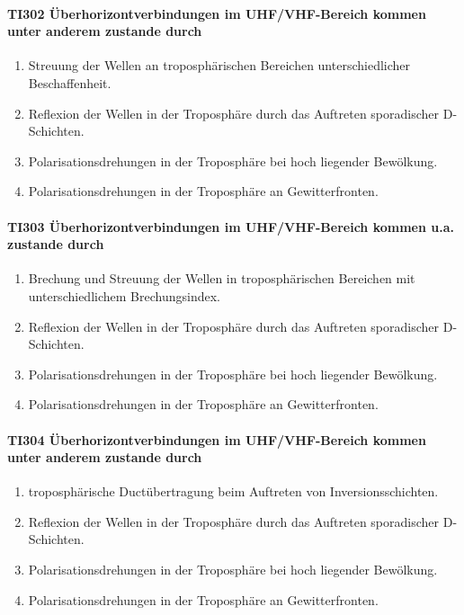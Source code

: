 \documentclass[8pt]{article}
\begin{document}
\paragraph*{TI302 Überhorizontverbindungen im UHF/VHF-Bereich kommen unter anderem zustande durch}
\begin{enumerate}[nolistsep,label=\Alph*]
\item Streuung der Wellen an troposphärischen Bereichen unterschiedlicher Beschaffenheit. 
\item Reflexion der Wellen in der Troposphäre durch das Auftreten sporadischer D-Schichten.
\item Polarisationsdrehungen in der Troposphäre bei hoch liegender Bewölkung.
\item Polarisationsdrehungen in der Troposphäre an Gewitterfronten.
\end{enumerate}

\paragraph*{TI303 Überhorizontverbindungen im UHF/VHF-Bereich kommen u.a. zustande durch} 
\begin{enumerate}[nolistsep,label=\Alph*]
\item Brechung und Streuung der Wellen in troposphärischen Bereichen mit unterschiedlichem Brechungsindex.
\item Reflexion der Wellen in der Troposphäre durch das Auftreten sporadischer D-Schichten. 
\item Polarisationsdrehungen in der Troposphäre bei hoch liegender Bewölkung.
\item Polarisationsdrehungen in der Troposphäre an Gewitterfronten.
\end{enumerate}

\paragraph*{TI304 Überhorizontverbindungen im UHF/VHF-Bereich kommen unter anderem zustande durch}
\begin{enumerate}[nolistsep,label=\Alph*]
\item troposphärische Ductübertragung beim Auftreten von Inversionsschichten.
\item Reflexion der Wellen in der Troposphäre durch das Auftreten sporadischer D-Schichten.
\item Polarisationsdrehungen in der Troposphäre bei hoch liegender Bewölkung.
\item Polarisationsdrehungen in der Troposphäre an Gewitterfronten.
\end{enumerate}
\end{document}
